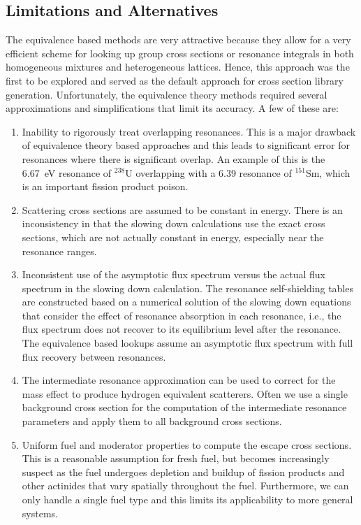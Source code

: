 \subsection{Limitations and Alternatives}

The equivalence based methods are very attractive because they allow for a very efficient scheme for looking up group cross sections or resonance integrals in both homogeneous mixtures and heterogeneous lattices. Hence, this approach was the first to be explored and served as the default approach for cross section library generation. Unfortunately, the equivalence theory methods required several approximations and simplifications that limit its accuracy. A few of these are:
\begin{enumerate}
  \item Inability to rigorously treat overlapping resonances. This is a major drawback of equivalence theory based approaches and this leads to significant error for resonances where there is significant overlap. An example of this is the 6.67~eV resonance of $^{238}$U overlapping with a 6.39 resonance of $^{151}$Sm, which is an important fission product poison.
  
  \item Scattering cross sections are assumed to be constant in energy. There is an inconsistency in that the slowing down calculations use the exact cross sections, which are not actually constant in energy, especially near the resonance ranges.
  
  \item Inconsistent use of the asymptotic flux spectrum versus the actual flux spectrum in the slowing down calculation. The resonance self-shielding tables are constructed based on a numerical solution of the slowing down equations that consider the effect of resonance absorption in each resonance, i.e., the flux spectrum does not recover to its equilibrium level after the resonance. The equivalence based lookups assume an asymptotic flux spectrum with full flux recovery between resonances.
  
  \item The intermediate resonance approximation can be used to correct for the mass effect to produce hydrogen equivalent scatterers. Often we use a single background cross section for the computation of the intermediate resonance parameters and apply them to all background cross sections.
  
  \item Uniform fuel and moderator properties to compute the escape cross sections. This is a reasonable assumption for fresh fuel, but becomes increasingly suspect as the fuel undergoes depletion and buildup of fission products and other actinides that vary spatially throughout the fuel. Furthermore, we can only handle a single fuel type and this limits its applicability to more general systems.
  

\end{enumerate}
